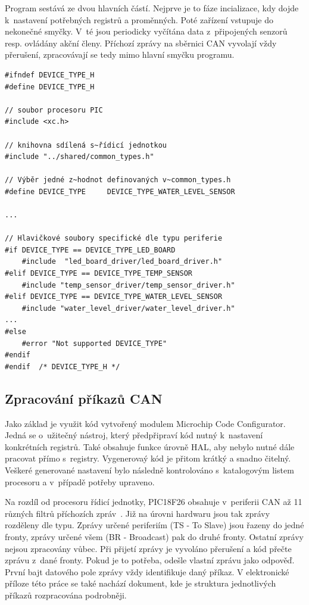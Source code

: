     Program sestává ze dvou hlavních částí. Nejprve je to fáze incializace, kdy dojde k~nastavení potřebných registrů a proměnných. Poté zařízení vstupuje do nekonečné smyčky. V~té jsou periodicky vyčítána data z~připojených senzorů resp. ovládány akční členy.  Příchozí zprávy na sběrnici CAN vyvolají vždy přerušení, zpracovávají se tedy mimo hlavní smyčku programu. 

\clearpage %
\begin{lstlisting}[frame=single,caption={Část souboru \texttt{device\_type.h} sloužící k~výběru typu cílené periferie.},label=lst:devicetype,basicstyle=\ttfamily\small, keywordstyle=\color{black}\bfseries\underbar,]
#ifndef DEVICE_TYPE_H
#define	DEVICE_TYPE_H

// soubor procesoru PIC
#include <xc.h>   

// knihovna sdílená s~řídicí jednotkou
#include "../shared/common_types.h" 

// Výběr jedné z~hodnot definovaných v~common_types.h
#define DEVICE_TYPE     DEVICE_TYPE_WATER_LEVEL_SENSOR

...

// Hlavičkové soubory specifické dle typu periferie
#if DEVICE_TYPE == DEVICE_TYPE_LED_BOARD
    #include  "led_board_driver/led_board_driver.h"
#elif DEVICE_TYPE == DEVICE_TYPE_TEMP_SENSOR
    #include "temp_sensor_driver/temp_sensor_driver.h"
#elif DEVICE_TYPE == DEVICE_TYPE_WATER_LEVEL_SENSOR
    #include "water_level_driver/water_level_driver.h"
...
#else
    #error "Not supported DEVICE_TYPE"
#endif
#endif	/* DEVICE_TYPE_H */
\end{lstlisting}

\subsection{Zpracování příkazů CAN}
    Jako základ je využit kód vytvořený modulem Microchip Code Configurator. Jedná se o~užitečný nástroj, který předpřipraví kód nutný k~nastavení konkrétních registrů. Také obsahuje funkce úrovně HAL, aby nebylo nutné dále pracovat přímo s~registry. Vygenerovaý kód je přitom krátký a snadno čitelný. Veškeré generované nastavení bylo následně kontrolováno s~katalogovým listem procesoru a v~případě potřeby upraveno. 

    Na rozdíl od procesoru řídicí jednotky, PIC18F26 obsahuje v~periferii CAN až 11 různých filtrů příchozích zpráv~\cite{PIC18F26Q83}. Již na úrovni hardwaru jsou tak zprávy rozděleny dle typu. Zprávy určené periferiím (TS - To Slave) jsou řazeny do jedné fronty, zprávy určené všem (BR - Broadcast) pak do druhé fronty. Ostatní zprávy nejsou zpracovány vůbec. Při přijetí zprávy je vyvoláno přerušení a kód přečte zprávu z~dané fronty. Pokud je to potřeba, odešle vlastní zprávu jako odpověď. První bajt datového pole zprávy vždy identifikuje daný příkaz. V elektronické příloze této práce se také nachází dokument, kde je struktura jednotlivých příkazů rozpracována podrobněji.

